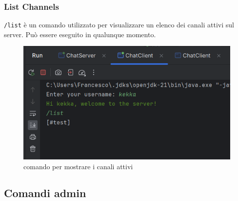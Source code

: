 \subsubsection{List Channels}
\texttt{/list} è un comando utilizzato per visualizzare un elenco dei canali attivi sul server. Può essere eseguito in qualunque momento.
\begin{figure}[h]
  \centering
  \begin{minipage}{0.45\textwidth}
    \includegraphics[width=\linewidth]{imagens/outputs/7.png}
    \caption{comando per mostrare i canali attivi}
  \end{minipage}\hfill
\end{figure}
\newpage

\subsection{Comandi admin}
